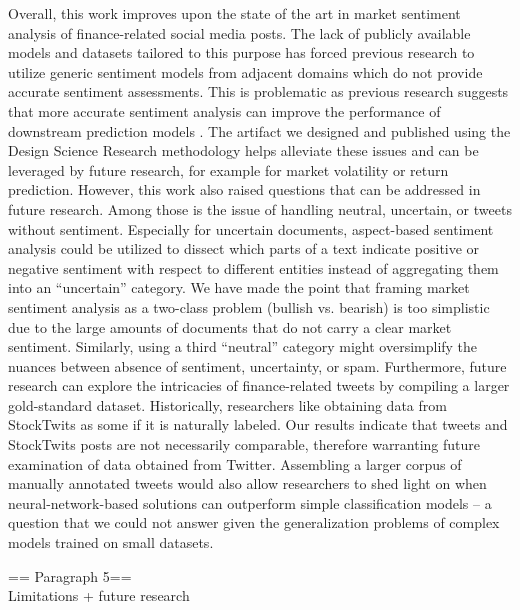Overall, this work improves upon the state of the art in market sentiment analysis of finance-related social media posts. The lack of publicly available models and datasets tailored to this purpose has forced previous research to utilize generic sentiment models from adjacent domains which do not provide accurate sentiment assessments. This is problematic as previous research suggests that more accurate sentiment analysis can improve the performance of downstream prediction models . The artifact we designed and published using the Design Science Research methodology helps alleviate these issues and can be leveraged by future research, for example for market volatility or return prediction.\newline
However, this work also raised questions that can be addressed in future research. Among those is the issue of handling neutral, uncertain, or tweets without sentiment. Especially for uncertain documents, aspect-based sentiment analysis could be utilized to dissect which parts of a text indicate positive or negative sentiment with respect to different entities instead of aggregating them into an ``uncertain'' category. We have made the point that framing market sentiment analysis as a two-class problem (bullish vs. bearish) is too simplistic due to the large amounts of documents that do not carry a clear market sentiment. Similarly, using a third ``neutral'' category might oversimplify the nuances between absence of sentiment, uncertainty, or spam.
Furthermore, future research can explore the intricacies of finance-related tweets by compiling a larger gold-standard dataset. Historically, researchers like obtaining data from StockTwits as some if it is naturally labeled. Our results indicate that tweets and StockTwits posts are not necessarily comparable, therefore warranting future examination of data obtained from Twitter. Assembling a larger corpus of manually annotated tweets would also allow researchers to shed light on when neural-network-based solutions can outperform simple classification models -- a question that we could not answer given the generalization problems of complex models trained on small datasets.

== Paragraph 5==\\
Limitations + future research










